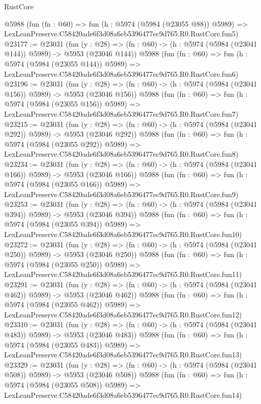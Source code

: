 \begin{lexlean}{RustCore}
\begin{coremodule}
    @5988
    (fun (fn : @60) =>
    fun (h : @5974 (@5984 (@23055 @88)) @5989) =>
    LexLeanPreserve.C58420ade6f3d08a6eb5396477ec9d765.R0.RustCore.fun5)
@23177 := @23031
    (fun (y : @28) => (fn : @60) -> (h : @5974 (@5984 (@23041 @144)) @5989) -> @5953 (@23046 @144))
    @5988
    (fun (fn : @60) =>
    fun (h : @5974 (@5984 (@23055 @144)) @5989) =>
    LexLeanPreserve.C58420ade6f3d08a6eb5396477ec9d765.R0.RustCore.fun6)
@23196 := @23031
    (fun (y : @28) => (fn : @60) -> (h : @5974 (@5984 (@23041 @156)) @5989) -> @5953 (@23046 @156))
    @5988
    (fun (fn : @60) =>
    fun (h : @5974 (@5984 (@23055 @156)) @5989) =>
    LexLeanPreserve.C58420ade6f3d08a6eb5396477ec9d765.R0.RustCore.fun7)
@23215 := @23031
    (fun (y : @28) => (fn : @60) -> (h : @5974 (@5984 (@23041 @292)) @5989) -> @5953 (@23046 @292))
    @5988
    (fun (fn : @60) =>
    fun (h : @5974 (@5984 (@23055 @292)) @5989) =>
    LexLeanPreserve.C58420ade6f3d08a6eb5396477ec9d765.R0.RustCore.fun8)
@23234 := @23031
    (fun (y : @28) => (fn : @60) -> (h : @5974 (@5984 (@23041 @166)) @5989) -> @5953 (@23046 @166))
    @5988
    (fun (fn : @60) =>
    fun (h : @5974 (@5984 (@23055 @166)) @5989) =>
    LexLeanPreserve.C58420ade6f3d08a6eb5396477ec9d765.R0.RustCore.fun9)
@23253 := @23031
    (fun (y : @28) => (fn : @60) -> (h : @5974 (@5984 (@23041 @394)) @5989) -> @5953 (@23046 @394))
    @5988
    (fun (fn : @60) =>
    fun (h : @5974 (@5984 (@23055 @394)) @5989) =>
    LexLeanPreserve.C58420ade6f3d08a6eb5396477ec9d765.R0.RustCore.fun10)
@23272 := @23031
    (fun (y : @28) => (fn : @60) -> (h : @5974 (@5984 (@23041 @250)) @5989) -> @5953 (@23046 @250))
    @5988
    (fun (fn : @60) =>
    fun (h : @5974 (@5984 (@23055 @250)) @5989) =>
    LexLeanPreserve.C58420ade6f3d08a6eb5396477ec9d765.R0.RustCore.fun11)
@23291 := @23031
    (fun (y : @28) => (fn : @60) -> (h : @5974 (@5984 (@23041 @462)) @5989) -> @5953 (@23046 @462))
    @5988
    (fun (fn : @60) =>
    fun (h : @5974 (@5984 (@23055 @462)) @5989) =>
    LexLeanPreserve.C58420ade6f3d08a6eb5396477ec9d765.R0.RustCore.fun12)
@23310 := @23031
    (fun (y : @28) => (fn : @60) -> (h : @5974 (@5984 (@23041 @483)) @5989) -> @5953 (@23046 @483))
    @5988
    (fun (fn : @60) =>
    fun (h : @5974 (@5984 (@23055 @483)) @5989) =>
    LexLeanPreserve.C58420ade6f3d08a6eb5396477ec9d765.R0.RustCore.fun13)
@23329 := @23031
    (fun (y : @28) => (fn : @60) -> (h : @5974 (@5984 (@23041 @508)) @5989) -> @5953 (@23046 @508))
    @5988
    (fun (fn : @60) =>
    fun (h : @5974 (@5984 (@23055 @508)) @5989) =>
    LexLeanPreserve.C58420ade6f3d08a6eb5396477ec9d765.R0.RustCore.fun14)

\end{coremodule}
\end{lexlean}
